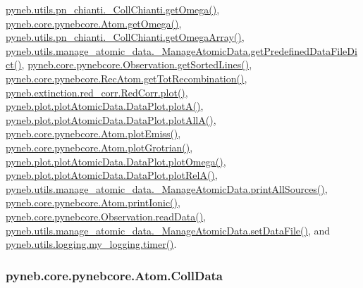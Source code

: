 \hyperlink{pn__chianti_8py_source_l00507}{pyneb.\-utils.\-pn\-\_\-chianti.\-\_\-\-Coll\-Chianti.\-get\-Omega()}, \hyperlink{pynebcore_8py_source_l01324}{pyneb.\-core.\-pynebcore.\-Atom.\-get\-Omega()}, \hyperlink{pn__chianti_8py_source_l00484}{pyneb.\-utils.\-pn\-\_\-chianti.\-\_\-\-Coll\-Chianti.\-get\-Omega\-Array()}, \hyperlink{manage__atomic__data_8py_source_l00034}{pyneb.\-utils.\-manage\-\_\-atomic\-\_\-data.\-\_\-\-Manage\-Atomic\-Data.\-get\-Predefined\-Data\-File\-Dict()}, \hyperlink{pynebcore_8py_source_l03684}{pyneb.\-core.\-pynebcore.\-Observation.\-get\-Sorted\-Lines()}, \hyperlink{pynebcore_8py_source_l02851}{pyneb.\-core.\-pynebcore.\-Rec\-Atom.\-get\-Tot\-Recombination()}, \hyperlink{red__corr_8py_source_l00303}{pyneb.\-extinction.\-red\-\_\-corr.\-Red\-Corr.\-plot()}, \hyperlink{plot_atomic_data_8py_source_l00117}{pyneb.\-plot.\-plot\-Atomic\-Data.\-Data\-Plot.\-plot\-A()}, \hyperlink{plot_atomic_data_8py_source_l00189}{pyneb.\-plot.\-plot\-Atomic\-Data.\-Data\-Plot.\-plot\-All\-A()}, \hyperlink{pynebcore_8py_source_l02384}{pyneb.\-core.\-pynebcore.\-Atom.\-plot\-Emiss()}, \hyperlink{pynebcore_8py_source_l02443}{pyneb.\-core.\-pynebcore.\-Atom.\-plot\-Grotrian()}, \hyperlink{plot_atomic_data_8py_source_l00373}{pyneb.\-plot.\-plot\-Atomic\-Data.\-Data\-Plot.\-plot\-Omega()}, \hyperlink{plot_atomic_data_8py_source_l00262}{pyneb.\-plot.\-plot\-Atomic\-Data.\-Data\-Plot.\-plot\-Rel\-A()}, \hyperlink{manage__atomic__data_8py_source_l00431}{pyneb.\-utils.\-manage\-\_\-atomic\-\_\-data.\-\_\-\-Manage\-Atomic\-Data.\-print\-All\-Sources()}, \hyperlink{pynebcore_8py_source_l02233}{pyneb.\-core.\-pynebcore.\-Atom.\-print\-Ionic()}, \hyperlink{pynebcore_8py_source_l03711}{pyneb.\-core.\-pynebcore.\-Observation.\-read\-Data()}, \hyperlink{manage__atomic__data_8py_source_l00380}{pyneb.\-utils.\-manage\-\_\-atomic\-\_\-data.\-\_\-\-Manage\-Atomic\-Data.\-set\-Data\-File()}, and \hyperlink{logging_8py_source_l00115}{pyneb.\-utils.\-logging.\-my\-\_\-logging.\-timer()}.

\hypertarget{classpyneb_1_1core_1_1pynebcore_1_1_atom_a976816067ec07396b4e27cfccbf15573}{
\subsubsection[{Coll\-Data}]{\setlength{\rightskip}{0pt plus 5cm}pyneb.\-core.\-pynebcore.\-Atom.\-Coll\-Data}}\label{classpyneb_1_1core_1_1pynebcore_1_1_atom_a976816067ec07396b4e27cfccbf15573}


